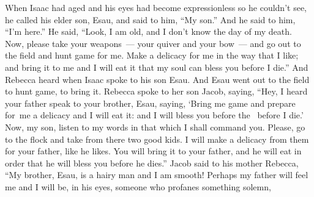 
\begin{inparaenum}
   When Isaac had aged and his eyes had become expressionless so he couldn't see, he called his elder son, Esau, and said to him, ``My son.'' And he said to him, ``I'm here.''%
   He said, ``Look, I am old, and I don't know the day of my death.%
   Now, please take your weapons~--- your quiver and your bow~--- and go out to the field and hunt game for me.%
   Make a delicacy%
  for me in the way that%
  I like; and bring it to me and I will eat it that my soul can bless you before I die.''%
   And Rebecca heard when Isaac spoke to his son Esau. And Esau went out to the field to hunt game, to bring it.%
   Rebecca spoke to her son Jacob, saying, ``Hey, I heard your father speak to your brother, Esau, saying,%
   `Bring me game and prepare for\understood{}\ me a delicacy and I will eat it: and I will bless you before the \lord\ before I die.'%
   Now, my son, listen to my words in that which I shall command you.%
   Please, go to the flock and take from there two good kids. I will make a delicacy from them for your father, like he likes.%
   You will bring it to your father, and he will eat in order that he will bless you before he dies.''%
   Jacob said to his mother Rebecca, ``My brother, Esau, is a hairy man and I am smooth!%
   Perhaps my father will feel me and I will be, in his eyes, someone who profanes something solemn,%

\end{inparaenum}
